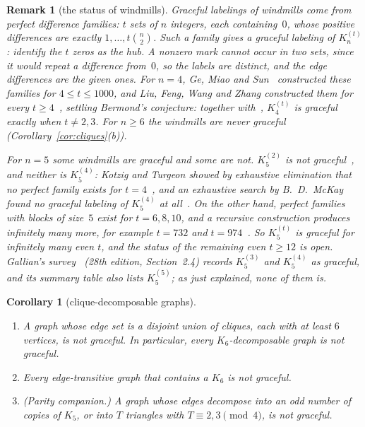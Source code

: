 \documentclass[11pt]{amsart}
\newcommand{\thmmarker}{}
\newcommand{\mnew}{\gdef\thmmarker{\textsuperscript{$\star$}}}
\theoremstyle{tplain}
\newtheorem{corollary}[theorem]{Corollary}
\theoremstyle{tdefinition}
\theoremstyle{tremark}
\newtheorem{remark}[theorem]{Remark}
\begin{document}
\begin{remark}[the status of windmills]\label{rem:windmills}
Graceful labelings of windmills come from \emph{perfect difference families}: $t$ sets
of $n$ integers, each containing~$0$, whose positive differences are exactly
$1,\dots,t\binom n2$. Such a family gives a graceful labeling of $K_n^{(t)}$:
identify the $t$ zeros as the hub. A nonzero mark cannot occur in two sets,
since it would repeat a difference from~$0$, so the labels are distinct, and
the edge differences are the given ones. For $n=4$, Ge, Miao and
Sun~\cite{gms} constructed these families for $4\le t\le1000$, and Liu, Feng,
Wang and Zhang constructed them for every $t\ge4$~\cite{lfwz}, settling
Bermond's conjecture: together with~\cite{bkt}, $K_4^{(t)}$ is graceful
exactly when $t\ne2,3$. For $n\ge6$ the windmills are never graceful
(Corollary~\ref{cor:cliques}(b)).

For $n=5$ some windmills are graceful and some are not. $K_5^{(2)}$ is not graceful~\cite{bkt}, and
neither is $K_5^{(4)}$: Kotzig and Turgeon showed by exhaustive elimination
that no perfect family exists for $t=4$~\cite{kt77}, and an exhaustive search by
B.~D.~McKay found no graceful labeling of $K_5^{(4)}$ at all~\cite{mo}. On the
other hand, perfect families with blocks of size~$5$ exist for $t=6,8,10$, and
a recursive construction produces infinitely many more, for example $t=732$
and $t=974$~\cite{mathon}. So $K_5^{(t)}$ \emph{is} graceful for
infinitely many even $t$, and the status of the remaining even $t\ge12$ is open.
Gallian's survey~\cite{gallian} (28th edition, Section~2.4) records
$K_5^{(3)}$ and $K_5^{(4)}$ as graceful, and its summary table also lists
$K_5^{(5)}$; as just explained, none of them is.
\end{remark}

\mnew\begin{corollary}[clique-decomposable graphs]\label{cor:decomp}
\leavevmode
\begin{enumerate}[label=(\alph*)]
\item A graph whose edge set is a disjoint union of cliques, each with at least
  $6$ vertices, is not graceful. In particular, every $K_6$-decomposable graph
  is not graceful.
\item Every edge-transitive graph that contains a $K_6$ is not graceful.
\item \emph{(Parity companion.)} A graph whose edges decompose into an odd
  number of copies of $K_5$, or into $T$ triangles with $T\equiv2,3\pmod4$, is
  not graceful.
\end{enumerate}
\end{corollary}
\end{document}
